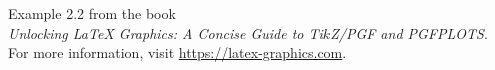 \documentclass{article}
\begin{document}
Example 2.2 from the book\\
\emph{Unlocking LaTeX Graphics: A Concise Guide to Ti$k$Z/PGF and PGFPLOTS}.\\
For more information, visit \url{https://latex-graphics.com}.
\par\bigskip

\end{document}
